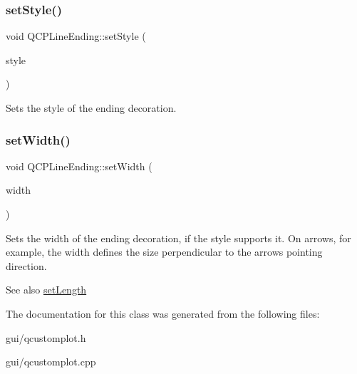 \subsubsection{\texorpdfstring{set\+Style()}{setStyle()}}
{\footnotesize\ttfamily void Q\+C\+P\+Line\+Ending\+::set\+Style (\begin{DoxyParamCaption}\item[{\hyperlink{classQCPLineEnding_a5ef16e6876b4b74959c7261d8d4c2cd5}{Q\+C\+P\+Line\+Ending\+::\+Ending\+Style}}]{style }\end{DoxyParamCaption})}

Sets the style of the ending decoration. \mbox{\label{classQCPLineEnding_a26dc020ea985a72cc25881ce2115e34e}} 
\subsubsection{\texorpdfstring{set\+Width()}{setWidth()}}
{\footnotesize\ttfamily void Q\+C\+P\+Line\+Ending\+::set\+Width (\begin{DoxyParamCaption}\item[{double}]{width }\end{DoxyParamCaption})}

Sets the width of the ending decoration, if the style supports it. On arrows, for example, the width defines the size perpendicular to the arrow\textquotesingle{}s pointing direction.

\begin{DoxySeeAlso}{See also}
\hyperlink{classQCPLineEnding_ae36fa01763751cd64b7f56c3507e935a}{set\+Length} 
\end{DoxySeeAlso}


The documentation for this class was generated from the following files\+:\begin{DoxyCompactItemize}
\item 
gui/qcustomplot.\+h\item 
gui/qcustomplot.\+cpp\end{DoxyCompactItemize}
